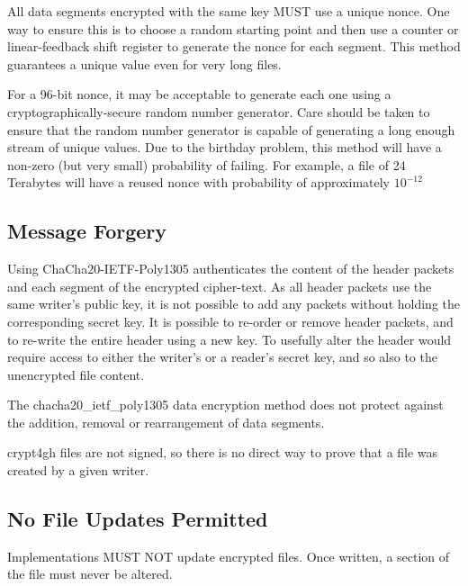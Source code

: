 \documentclass[10pt]{article}
\begin{document}
All data segments encrypted with the same key MUST use a unique nonce.
One way to ensure this is to choose a random starting point and then use a counter or linear-feedback shift
register to generate the nonce for each segment.
This method guarantees a unique value even for very long files.

For a 96-bit nonce, it may be acceptable to generate each one using a cryptographically-secure random number
generator.
Care should be taken to ensure that the random number generator is capable of generating a long enough stream
of unique values.
Due to the birthday problem, this method will have a non-zero (but very small) probability of failing.
For example, a file of 24 Terabytes will have a reused nonce with probability of approximately $10^{-12}$

\subsection{Message Forgery}
Using ChaCha20-IETF-Poly1305 authenticates the content of the header packets and each segment of the encrypted
cipher-text.
As all header packets use the same writer's public key,
it is not possible to add any packets without holding the corresponding secret key.
It is possible to re-order or remove header packets,
and to re-write the entire header using a new key.
To usefully alter the header would require access to either the writer's or a reader's secret key,
and so also to the unencrypted file content.

The chacha20\_ietf\_poly1305 data encryption method does not protect against the addition,
removal or rearrangement of data segments.

crypt4gh files are not signed, so there is no direct way to prove that a file was created by a given writer.

\subsection{No File Updates Permitted}
Implementations MUST NOT update encrypted files.
Once written, a section of the file must never be altered.


\end{document}

